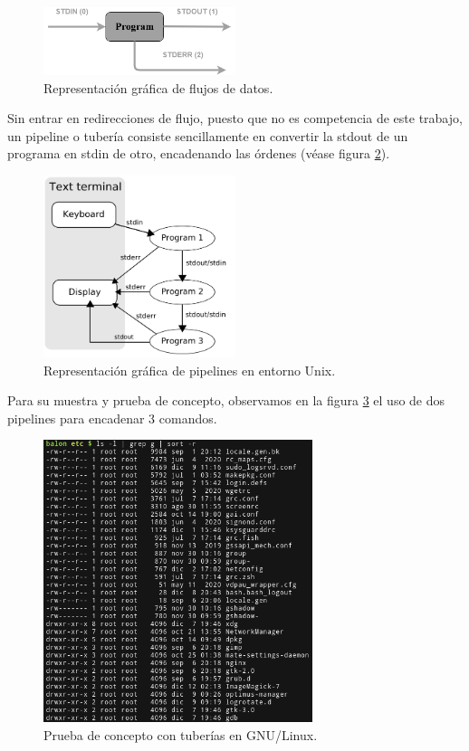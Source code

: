 \documentclass[a4paper, 11pt, titlepage]{article}
\begin{document}
    \begin{figure}[htp]
        \centering
        \includegraphics[width=0.5\textwidth]{resources/std00.png}
        \caption{Representación gráfica de flujos de datos.}
        \label{std00}
    \end{figure}

    Sin entrar en redirecciones de flujo, puesto que no es competencia de este trabajo, un pipeline o tubería consiste
    sencillamente en convertir la stdout de un programa en stdin de otro, encadenando las órdenes (véase figura \ref{pipe01}).

    \begin{figure}[htp]
        \centering
        \includegraphics[width=0.5\textwidth]{resources/pipe01.png}
        \caption{Representación gráfica de pipelines en entorno Unix.}
        \label{pipe01}
    \end{figure}

    Para su muestra y prueba de concepto, observamos en la figura \ref{pipe02} el uso de dos pipelines para encadenar 3 comandos.

    \begin{figure}[htp]
        \centering
        \includegraphics[width=0.7\textwidth]{resources/pipe02.png}
        \caption{Prueba de concepto con tuberías en GNU/Linux.}
        \label{pipe02}
    \end{figure}
\end{document}
